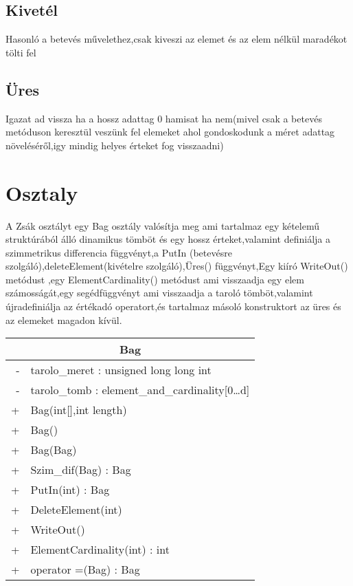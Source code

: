 \documentclass{article}
\begin{document}
\subsection{Kivetél}
Hasonló a betevés művelethez,csak kiveszi az elemet és az elem nélkül maradékot tölti fel
\subsection{Üres}
Igazat ad vissza ha a hossz adattag 0 hamisat ha nem(mivel csak a betevés metóduson keresztül veszünk fel elemeket ahol gondoskodunk a méret adattag növeléséről,igy mindig helyes érteket fog visszaadni)
\section{Osztaly}
A Zsák osztályt egy Bag osztály valósítja meg ami tartalmaz egy kételemű struktúrából álló dinamikus tömböt és egy hossz érteket,valamint definiálja a szimmetrikus differencia függvényt,a PutIn (betevésre szolgáló),deleteElement(kivételre szolgáló),Üres() függvényt,Egy kiíró WriteOut() metódust ,egy ElementCardinality() metódust ami visszaadja egy elem számosságát,egy segédfüggvényt ami visszaadja a taroló tömböt,valamint újradefiniálja az értékadó operatort,és tartalmaz másoló konstruktort az üres és az elemeket magadon kívül.

        \begin{tabular}{|r|l|}
            \hline
              \multicolumn{2}{c}{Bag} \\
            \hline
            - & tarolo\_meret : unsigned long long int\\
            - & tarolo\_tomb : element\_and\_cardinality[0\dots d]\\
            \hline
            + & Bag(int[],int length) \\
            + & Bag() \\
            + & Bag(Bag) \\
            + & Szim\_dif(Bag) : Bag\\
            + & PutIn(int) : Bag\\
            + & DeleteElement(int)\\
            + & WriteOut()\\
            + & ElementCardinality(int) : int\\
            + & operator =(Bag) : Bag\\
            \hline
        \end{tabular}
   
\end{document}
